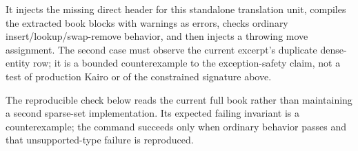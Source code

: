 It injects the missing direct  header for this standalone translation unit, compiles the extracted book blocks with warnings as errors, checks ordinary insert/lookup/swap-remove behavior, and then injects a throwing move assignment. The second case must observe the current excerpt's duplicate dense-entity row; it is a bounded counterexample to the exception-safety claim, not a test of production Kairo or of the constrained signature above.

The reproducible check below reads the current full book rather than maintaining a second sparse-set implementation. Its expected failing invariant is a counterexample; the command succeeds only when ordinary behavior passes and that unsupported-type failure is reproduced.

